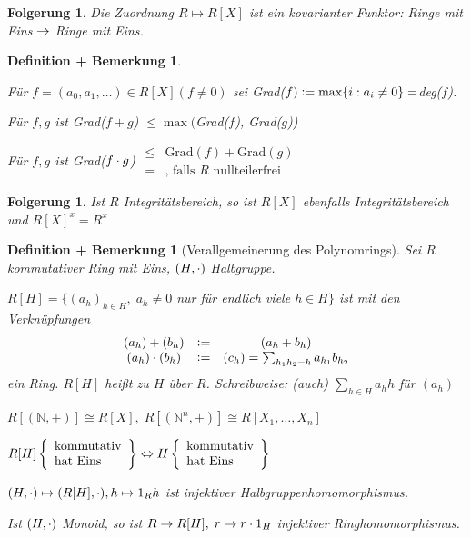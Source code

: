 \documentclass[a4paper,10pt,german]{scrbook}
\theoremstyle{saetze}
\theoremstyle{definitionen}
\newtheorem{DefBem}[Def]{Definition + Bemerkung}
\newtheorem{Folg}[Def]{Folgerung}
\begin{document}
\begin{Folg}
Die Zuordnung $R \mapsto R[X]$ ist ein
kovarianter Funktor: Ringe mit Eins $\rightarrow$ Ringe mit Eins.

\end{Folg}

\begin{DefBem}
\begin{enum}
\item Für $f=(a_0,a_1,\dots) \in R[X] (f \neq 0)$ sei Grad($f) \mathrel{\mathop:}=
\max\{i: a_i \neq 0\} = $deg($f$).
\item Für $f,g$ ist Grad($f+g$) $\leq \max($Grad($f$), Grad($g$))
\item Für $f,g$ ist Grad($f\cdot g$) $\begin{array}{cc} \leq & \mbox{Grad}(f) +
\mbox{Grad}(g) \\
= & \mbox{, falls } R \mbox{ nullteilerfrei} \end{array}$
\end{enum}
\end{DefBem}

\begin{Folg}
Ist $R$ Integritätsbereich, so ist $R[X]$
ebenfalls Integritätsbereich und $R[X]^x = R^x$
\end{Folg}

\begin{DefBem}[Verallgemeinerung des Polynomrings]
\label{2.13}
Sei $R$ kommutativer Ring mit Eins, $(H,\cdot)$ Halbgruppe.
\begin{enum}
\item $R[H] = \{(a_h)_{h \in H},\; a_h \neq 0$ nur für endlich viele
$h\in H\}$ ist mit den Verknüpfungen \[\begin{array}{ccc}
(a_h)+(b_h) &\mathrel{\mathop:}=& (a_h + b_h) \\
(a_h)\cdot(b_h) &\mathrel{\mathop:}=& (c_h) = \sum_{h_1 h_2 = h} a_{h_1} b_{h_2}
\end{array}\]
ein Ring. $R[H]$ heißt  zu $H$ über $R$.
\newline Schreibweise: (auch) $\sum_{h \in H} a_h h$ für $(a_h)$
\item $R[(\mathbb{N},+)] \cong R[X],\; R[(\mathbb{N}^n,+)] \cong
R[X_1,\dots,X_n]$
\item $R[H] \left\{\begin{array}{l} \mbox{kommutativ} \\ \mbox{hat Eins}
\end{array}\right\} \Leftrightarrow H \left\{\begin{array}{l} \mbox{kommutativ} \\ \mbox{hat Eins}
\end{array}\right\}$
\item $(H,\cdot) \mapsto (R[H],\cdot), h \mapsto 1_R h$ ist injektiver
Halbgruppenhomomorphismus.
\item Ist $(H,\cdot)$ Monoid, so ist $R \rightarrow R[H], \; r\mapsto r\cdot
1_H$ injektiver Ringhomomorphismus. \end{enum} \sbew{-}
\end{DefBem}
\end{document}
